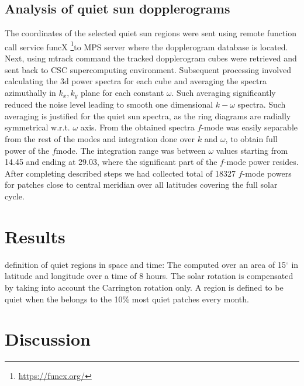 \documentclass[twocolumn,linenumbers,trackchanges]{aastex631}
\begin{document}
\subsection{Analysis of quiet sun dopplerograms}
The coordinates of the selected quiet sun regions were sent using remote function call service funcX \footnote{\url{https://funcx.org/}}to MPS server where the dopplerogram database is located. Next, using mtrack command the tracked dopplerogram cubes were retrieved and sent back to CSC supercomputing environment. Subsequent processing involved calculating the 3d power spectra for each cube and averaging the spectra azimuthally in $k_x, k_y$ plane for each constant $\omega$. Such averaging significantly reduced the noise level leading to smooth one dimensional $k-\omega$ spectra. Such averaging is justified for the quiet sun spectra, as the ring diagrams are radially symmetrical w.r.t. $\omega$ axis. From the obtained spectra $f$-mode was easily separable from the rest of the modes and integration done over $k$ and $\omega$, to obtain full power of the $f$mode. The integration range was between $\omega$ values starting from 14.45 and ending at 29.03, where the significant part of the $f$-mode power resides. After completing described steps we had collected total of 18327 $f$-mode powers for patches close to central meridian over all latitudes covering the full solar cycle.

\section{Results}


definition of quiet regions in space and time: 
The \brms{} computed over an area of 15$^\circ$ in latitude and longitude over a time of 8 hours. The solar rotation is compensated by taking into account the Carrington rotation only. A region is defined to be quiet when the \brms{} belongs to the 10\% most quiet patches every month.







\section{Discussion}


{}

\end{document}
